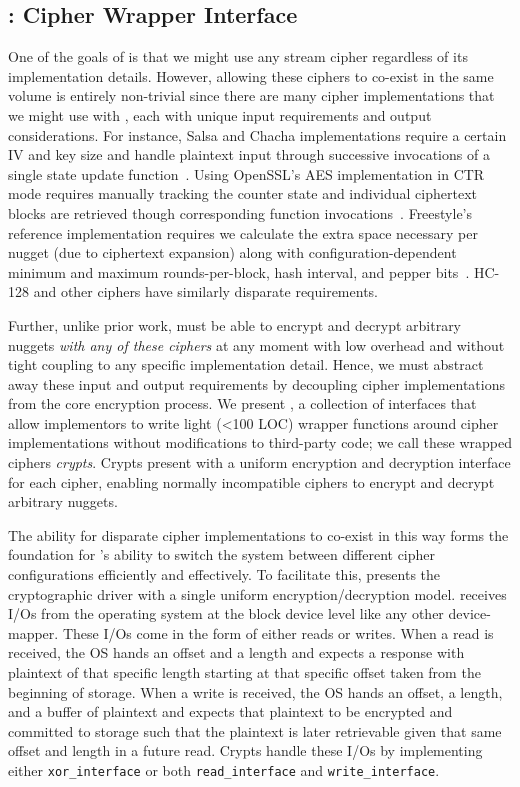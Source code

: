 \subsection{\sysB: Cipher Wrapper Interface}\label{subsec:des-crypts}

One of the goals of \sys is that we might use any stream cipher regardless of
its implementation details. However, allowing these ciphers to co-exist in the
same volume is entirely non-trivial since there are many cipher implementations
that we might use with \sys, each with unique input requirements and output
considerations. For instance, Salsa and Chacha implementations require a certain
IV and key size and handle plaintext input through successive invocations of a
single state update function~\cite{Floodyberry}. Using OpenSSL's AES
implementation in CTR mode requires manually tracking the counter state and
individual ciphertext blocks are retrieved though corresponding function
invocations~\cite{OpenSSL}. Freestyle's reference implementation requires we
calculate the extra space necessary per nugget (due to ciphertext expansion)
along with configuration-dependent minimum and maximum rounds-per-block, hash
interval, and pepper bits~\cite{Freestyle}. HC-128 and other ciphers have
similarly disparate requirements.

Further, unlike prior work, \sys must be able to encrypt and decrypt arbitrary
nuggets {\em with any of these ciphers} at any moment with low overhead and
without tight coupling to any specific implementation detail. Hence, we must
abstract away these input and output requirements by decoupling cipher
implementations from the core encryption process. We present \sysB, a collection
of interfaces that allow implementors to write light (<100 LOC) wrapper
functions around cipher implementations without modifications to third-party
code; we call these wrapped ciphers {\em crypts}. Crypts present \sys with a
uniform encryption and decryption interface for each cipher, enabling normally
incompatible ciphers to encrypt and decrypt arbitrary nuggets.

The ability for disparate cipher implementations to co-exist in this way forms
the foundation for \sys's ability to switch the system between different cipher
configurations efficiently and effectively. To facilitate this, \sysB presents
the cryptographic driver with a single uniform encryption/decryption model. \sys
receives I/Os from the operating system at the block device level like any other
device-mapper. These I/Os come in the form of either reads or writes. When a
read is received, the OS hands \sys an offset and a length and expects a
response with plaintext of that specific length starting at that specific offset
taken from the beginning of storage. When a write is received, the OS hands \sys
an offset, a length, and a buffer of plaintext and expects that plaintext to be
encrypted and committed to storage such that the plaintext is later retrievable
given that same offset and length in a future read. Crypts handle these I/Os by
implementing either \texttt{xor\_interface} or both \texttt{read\_interface} and
\texttt{write\_interface}.

